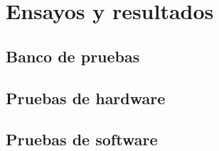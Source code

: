 
\chapter{Ensayos y resultados} %

\label{Chapter4} %


\section{Banco de pruebas}
\label{sec:pruebasHW}

\section{Pruebas de hardware}

\section{Pruebas de software}